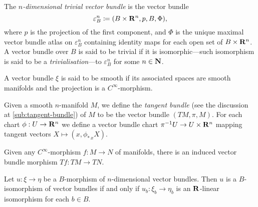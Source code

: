 \documentclass[../../../deep-dive]{subfile}
\begin{document}
\begin{definition}
    \label{def:trivial-vector-bundle}
    The \emph{\(n\)-dimensional trivial vector bundle} is the vector bundle
    \[
        \varepsilon_B^n \coloneq (B \times \mathbf{R}^n, p, B, \Phi),
    \]
    where \(p\) is the projection of the first component, and \(\Phi\) is the unique
    maximal vector bundle atlas on \(\varepsilon_B^n\) containing identity maps for
    each open set of \(B \times \mathbf{R}^n\). A vector bundle over \(B\) is said to be
    trivial if it is isomorphic---such isomorphism is said to be a
    \emph{trivialisation}---to \(\varepsilon_B^n\) for some \(n \in \mathbf{N}\).
\end{definition}

\begin{definition}
    \label{def:smooth-bundles}
    A vector bundle \(\xi\) is said to be smooth if its associated spaces are smooth
    manifolds and the projection is a \(C^{\infty}\)-morphism.
\end{definition}

\begin{example}
    \label{exp:tangent-bundle}
    Given a smooth \(n\)-manifold \(M\), we define the \emph{tangent bundle} (see
    the discussion at \cref{sub:tangent-bundle}) of \(M\) to be the vector bundle
    \((T M, \pi, M)\). For each chart \(\phi: U \to \mathbf{R}^n\) we define a vector bundle
    chart \(\pi^{-1} U \to U \times \mathbf{R}^n\) mapping tangent vectors
    \(X \mapsto (x, \phi_{*\, x} X)\).

    Given any \(C^{\infty}\)-morphism \(f: M \to N\) of manifolds, there is an
    induced vector bundle morphism \(T f: T M \to T N\).
\end{example}

\begin{theorem}
    \label{thm:isomorphism-of-vector-bundles}
    Let \(u: \xi \to \eta\) be a \(B\)-morphism of \(n\)-dimensional vector
    bundles. Then \(u\) is a \(B\)-isomorphism of vector bundles if and only if
    \(u_b: \xi_b \to \eta_b\) is an \(\mathbf{R}\)-linear isomorphism for each \(b \in B\).
\end{theorem}
\end{document}

